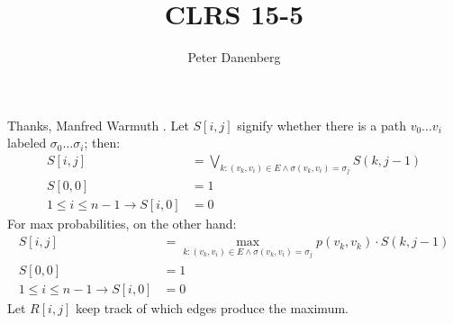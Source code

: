 \documentclass{article}
\title{CLRS 15-5}
\author{Peter Danenberg}
\begin{document}
\maketitle

Thanks, Manfred Warmuth \cite{warmuth:05}. Let $S[i,j]$ signify whether there is a path
$v_0\dots v_i$ labeled $\sigma_0\dots \sigma_i$; then:
\begin{align}
  S[i,j] &= \underset{k:(v_k,v_i)\in E\wedge\sigma(v_k,v_i)=\sigma_j}{\bigvee}S(k,j-1)\\
  S[0,0] &= 1\\
  1\leq i\leq n-1\to S[i,0]&= 0
\end{align}
For max probabilities, on the other hand:
\begin{align}
  S[i,j] &= \max_{k:(v_k,v_i)\in E\wedge\sigma(v_k,v_i)=\sigma_j}p(v_k,v_k)\cdot S(k,j-1)\\
  S[0,0] &= 1\\
  1\leq i\leq n-1\to S[i,0]&= 0
\end{align}
Let $R[i,j]$ keep track of which edges produce the maximum.


\end{document}
